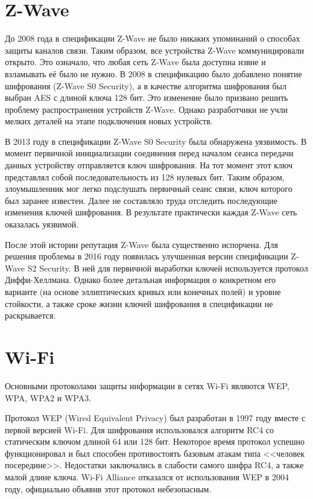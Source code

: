 	
	\section{Z-Wave}
	До 2008 года в спецификации Z-Wave не было никаких упоминаний о способах защиты каналов связи. 
	Таким образом, все устройства Z-Wave коммуницировали открыто. Это означало, что любая сеть Z-Wave 
	была доступна извне и взламывать её было не нужно. В 2008 в спецификацию было добавлено понятие 
	шифрования (Z-Wave S0 Security), а в качестве алгоритма шифрования был выбран AES с длиной ключа 128 бит. 
	Это изменение было призвано решить проблему распространения устройств Z-Wave. Однако разработчики
	не учли мелких деталей на этапе подключения новых устройств.
	
	В 2013 году в спецификации  Z-Wave S0 Security была обнаружена уязвимость. В момент первичной 
	инициализации соединения перед началом сеанса передачи данных устройству отправляется ключ шифрования.
	На тот момент этот ключ представлял собой последовательность из 128 нулевых бит. Таким образом, злоумышленник
	мог легко подслушать первичный сеанс связи, ключ которого был заранее известен. Далее не
	составляло труда отследить последующие изменения ключей шифрования. В результате практически
	каждая Z-Wave сеть оказалась уязвимой.
	
	После этой истории репутация Z-Wave была существенно испорчена. Для решения проблемы в 2016 году
	появилась улучшенная версии спецификации Z-Wave S2 Security. В ней для первичной выработки ключей
	используется протокол Диффи-Хеллмана. Однако более детальная информация о конкретном его варианте
	(на основе эллиптических кривых или конечных полей) и уровне стойкости, а также сроке жизни ключей
	шифрования в спецификации не раскрывается.
	
	
	\section{Wi-Fi}
	Основными протоколами защиты информации в сетях Wi-Fi являются WEP, WPA, WPA2 и WPA3.
	
	Протокол WEP (Wired Equivalent Privacy) был разработан в 1997 году вместе с первой версией Wi-Fi.
	Для шифрования использовался алгоритм RC4 со статическим ключом длиной 64 или 128 бит. Некоторое время
	протокол успешно функционировал и был способен противостоять базовым атакам типа <<человек посередине>>.
	Недостатки заключались в слабости самого шифра RC4, а также малой длине ключа. Wi-Fi Alliance отказался 
	от использования WEP в 2004 году, официально объявив этот протокол небезопасным.
	

